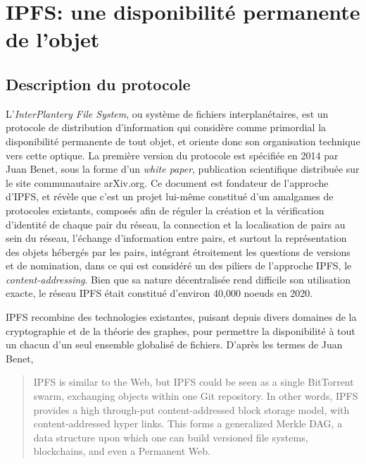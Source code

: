 \documentclass{article}
\begin{document}
\section{IPFS: une disponibilité permanente de l'objet}

\subsection{Description du protocole}

L'\emph{InterPlantery File System}, ou système de fichiers interplanétaires, est un protocole de distribution d'information qui considère comme primordial la disponibilité permanente de tout objet, et oriente donc son organisation technique vers cette optique. La première version du protocole est spécifiée en 2014 par Juan Benet, sous la forme d'un \emph{white paper}, publication scientifique distribuée sur le site communautaire arXiv.org. Ce document est fondateur de l'approche d'IPFS, et révèle que c'est un projet lui-même constitué d'un amalgames de protocoles existants, composés afin de réguler la création et la vérification d'identité de chaque pair du réseau, la connection et la localisation de pairs au sein du réseau, l'échange d'information entre pairs, et surtout la représentation des objets hébergés par les pairs, intégrant étroitement les questions de versions et de nomination, dans ce qui est considéré un des piliers de l'approche IPFS, le \emph{content-addressing}\cite{benet_ipfs_2014}. Bien que sa nature décentralisée rend difficile son utilisation exacte, le réseau IPFS était constitué d'environ 40,000 noeuds en 2020\cite{henningsen_mapping_2020}.

IPFS recombine des technologies existantes, puisant depuis divers domaines de la cryptographie et de la théorie des graphes, pour permettre la disponibilité à tout un chacun d'un seul ensemble globalisé de fichiers. D'après les termes de Juan Benet,

\begin{quote}
    IPFS is similar to the Web, but IPFS could be seen as a single BitTorrent swarm, exchanging objects within one Git repository. In other words, IPFS provides a high through-put content-addressed block storage model, with content-addressed hyper links. This forms a generalized Merkle DAG, a data structure upon which one can build versioned file systems, blockchains, and even a Permanent Web.
\end{quote}
\end{document}
